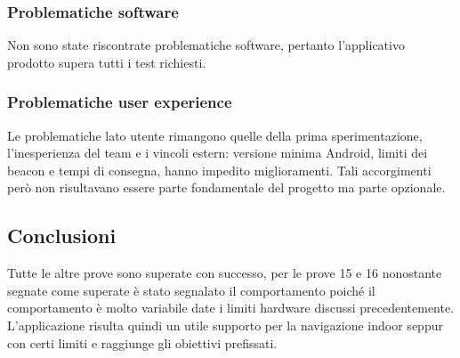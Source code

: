 \documentclass[../Sperimentazione.tex]{subfiles}
\begin{document}
			\subsubsection{Problematiche software}
				Non sono state riscontrate problematiche software, pertanto l'applicativo prodotto supera tutti i test richiesti.
		
			\subsubsection{Problematiche user experience}
				Le problematiche lato utente rimangono quelle della prima sperimentazione, l'inesperienza del team e i vincoli estern: versione minima Android, limiti dei beacon e tempi di consegna, hanno impedito miglioramenti. Tali accorgimenti però non risultavano essere parte fondamentale del progetto ma parte opzionale.
			
		\newpage
		\subsection{Conclusioni}
			Tutte le altre prove sono superate con successo, per le prove 15 e 16 nonostante segnate come superate è stato segnalato il comportamento poiché il comportamento è molto variabile date i limiti hardware discussi precedentemente.
			L'applicazione risulta quindi un utile supporto per la navigazione indoor seppur con certi limiti e raggiunge gli obiettivi prefissati.
			
\end{document}
